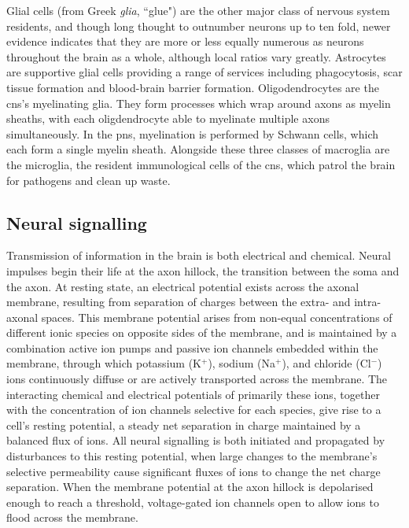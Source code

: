 Glial cells (from Greek \textit{glia}, ``glue") are the other major class of nervous system residents, and though long thought to outnumber neurons up to ten fold, newer evidence indicates that they are more or less equally numerous as neurons throughout the brain as a whole, although local ratios vary greatly.\autocite{Herculano-Houzel2014}
Astrocytes are supportive glial cells providing a range of services including phagocytosis, scar tissue formation and blood-brain barrier formation.
Oligodendrocytes are the \gls{cns}'s myelinating glia.
They form processes which wrap around axons as myelin sheaths, with each oligdendrocyte able to myelinate multiple axons simultaneously.
In the \gls{pns}, myelination is performed by Schwann cells, which each form a single myelin sheath.
Alongside these three classes of macroglia are the microglia, the resident immunological cells of the \gls{cns}, which patrol the brain for pathogens and clean up waste.

\subsection{Neural signalling}

Transmission of information in the brain is both electrical and chemical.
Neural impulses begin their life at the axon hillock, the transition between the soma and the axon.
At resting state, an electrical potential exists across the axonal membrane, resulting from separation of charges between the extra- and intra-axonal spaces.
This membrane potential arises from non-equal concentrations of different ionic species on opposite sides of the membrane, and is maintained by a combination active ion pumps and passive ion channels embedded within the membrane, through which potassium (K$^+$), sodium (Na$^+$), and chloride (Cl$^-$) ions continuously diffuse or are actively transported across the membrane.
The interacting chemical and electrical potentials of primarily these ions, together with the concentration of ion channels selective for each species, give rise to a cell's resting potential, a steady net separation in charge maintained by a balanced flux of ions.
All neural signalling is both initiated and propagated by disturbances to this resting potential, when large changes to the membrane's selective permeability cause significant fluxes of ions to change the net charge separation.
When the membrane potential at the axon hillock is depolarised enough to reach a threshold, voltage-gated ion channels open to allow ions to flood across the membrane.

